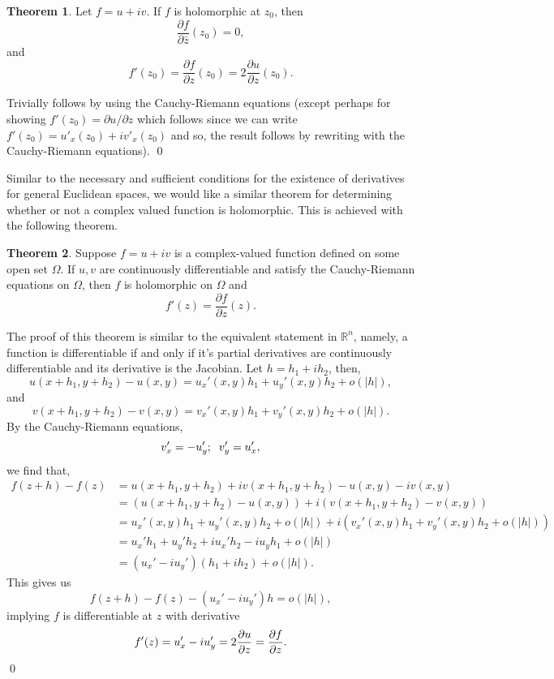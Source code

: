\documentclass[
]{article}
\theoremstyle{definition}
\newtheorem{theorem}{Theorem}
\theoremstyle{definition}
\begin{document}
\begin{theorem}
  Let \(f = u + iv\). If \(f\) is holomorphic at \(z_0\), then 
  \[\frac{\partial f}{\partial \bar{z}}(z_0) = 0,\]
  and 
  \[f'(z_0) = \frac{\partial f}{\partial z}(z_0) = 2 \frac{\partial u}{\partial z}(z_0).\]
\end{theorem}
\proof

Trivially follows by using the Cauchy-Riemann equations (except perhaps
for showing \(f'(z_0) = \partial u / \partial z\) which follows since we
can write \(f'(z_0) = u'_x(z_0) + iv'_x(z_0)\) and so, the result
follows by rewriting with the Cauchy-Riemann equations). \qed

Similar to the necessary and sufficient conditions for the existence of
derivatives for general Euclidean spaces, we would like a similar
theorem for determining whether or not a complex valued function is
holomorphic. This is achieved with the following theorem.

\begin{theorem}
  Suppose \(f = u + iv\) is a complex-valued function defined on some open set 
  \(\Omega\). If \(u, v\) are continuously differentiable and satisfy the 
  Cauchy-Riemann equations on \(\Omega\), then \(f\) is holomorphic on \(\Omega\) 
  and 
  \[f'(z) = \frac{\partial f}{\partial z}(z).\]
\end{theorem}

The proof of this theorem is similar to the equivalent statement in
\(\mathbb{R}^n\), namely, a function is differentiable if and only if
it's partial derivatives are continuously differentiable and its
derivative is the Jacobian. \proof Let \(h = h_1 + ih_2\), then,
\[u(x + h_1, y + h_2) - u(x, y) = u_x'(x, y)h_1 + u_y'(x, y)h_2 + o(\left|h\right|),\]
and
\[v(x + h_1, y + h_2) - v(x, y) = v_x'(x, y)h_1 + v_y'(x, y)h_2 + o(\left|h\right|).\]
By the Cauchy-Riemann equations,
\[v_x' = -u_y'; \hspace{2mm} v_y'= u_x',\] we find that, \[\begin{split}
      f(z + h) - f(z) & = u(x + h_1, y + h_2) + iv(x + h_1, y + h_2) - u(x, y) - iv(x, y)\\
        & = (u(x + h_1, y + h_2) - u(x, y)) + i(v(x + h_1, y + h_2) - v(x, y))\\
        & = u_x'(x, y)h_1 + u_y'(x, y)h_2 + o(\left|h\right|) + i(v_x'(x, y)h_1 + v_y'(x, y)h_2 + o(\left|h\right|))\\
        & = u_x' h_1 + u_y' h_2 + i u_x' h_2- i u_y h_1 + o(\left|h\right|)\\
        & = (u_x' - iu_y')(h_1 + ih_2) + o(\left|h\right|).
    \end{split}\] This gives us
\[f(z + h) - f(z) - (u_x' - iu_y')h = o(\left|h\right|),\] implying
\(f\) is differentiable at \(z\) with derivative
\[f'(z) = u_x' - iu_y' = 2\pdv{u}{z} = \pdv{f}{z}.\] \qed
\end{document}
